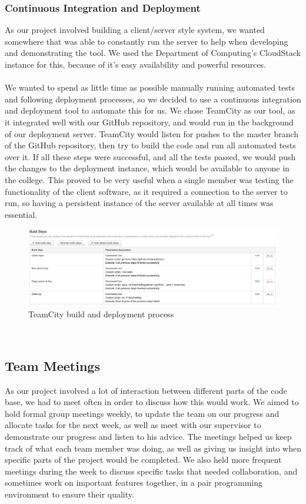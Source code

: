\documentclass{article}
\begin{document}
\subsubsection{Continuous Integration and Deployment}
As our project involved building a client/server style system, we wanted somewhere that was able to constantly run the server to help when developing and demonstrating the tool. We used the Department of Computing's CloudStack instance for this, because of it's easy availability and powerful resources. 
\\\\
We wanted to spend as little time as possible manually running automated tests and following deployment processes, so we decided to use a continuous integration and deployment tool to automate this for us. We chose TeamCity as our tool, as it integrated well with our GitHub repository, and would run in the background of our deployment server. TeamCity would listen for pushes to the master branch of the GitHub repository, then try to build the code and run all automated tests over it. If all these steps were successful, and all the tests passed, we would push the changes to the deployment instance, which would be available to anyone in the college. This proved to be very useful when a single member was testing the functionality of the client software, as it required a connection to the server to run, so having a persistent instance of the server available at all times was essential. 
\begin{figure}[h]
  \centering
  \includegraphics[scale=0.35]{buildserver}
  \caption{TeamCity build and deployment process}
  \label{fig:buildserver}
\end{figure}
\\ 
\subsection{Team Meetings}
As our project involved a lot of interaction between different parts of the code base, we had to meet often in order to discuss how this would work. We aimed to hold formal group meetings weekly, to update the team on our progress and allocate tasks for the next week, as well as meet with our supervisor to demonstrate our progress and listen to his advice. The meetings helped us keep track of what each team member was doing, as well as giving us insight into when specific parts of the project would be completed. We also held more frequent meetings during the week to discuss specific tasks that needed collaboration, and sometimes work on important features together, in a pair programming environment to ensure their quality. 
\end{document}
